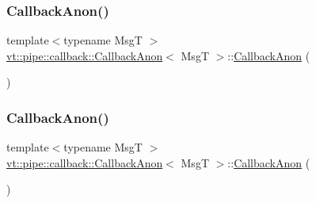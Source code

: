 \subsubsection{\texorpdfstring{Callback\+Anon()}{CallbackAnon()}\hspace{0.1cm}{\footnotesize\ttfamily [1/3]}}
{\footnotesize\ttfamily template$<$typename MsgT $>$ \\
\hyperlink{structvt_1_1pipe_1_1callback_1_1_callback_anon}{vt\+::pipe\+::callback\+::\+Callback\+Anon}$<$ MsgT $>$\+::\hyperlink{structvt_1_1pipe_1_1callback_1_1_callback_anon}{Callback\+Anon} (\begin{DoxyParamCaption}{ }\end{DoxyParamCaption})\hspace{0.3cm}{\ttfamily [default]}}

\mbox{\label{structvt_1_1pipe_1_1callback_1_1_callback_anon_a1979ced8fbd839d64f67eafb8fccdcff}} 
\subsubsection{\texorpdfstring{Callback\+Anon()}{CallbackAnon()}\hspace{0.1cm}{\footnotesize\ttfamily [2/3]}}
{\footnotesize\ttfamily template$<$typename MsgT $>$ \\
\hyperlink{structvt_1_1pipe_1_1callback_1_1_callback_anon}{vt\+::pipe\+::callback\+::\+Callback\+Anon}$<$ MsgT $>$\+::\hyperlink{structvt_1_1pipe_1_1callback_1_1_callback_anon}{Callback\+Anon} (\begin{DoxyParamCaption}\item[{\hyperlink{structvt_1_1pipe_1_1callback_1_1_callback_anon}{Callback\+Anon}$<$ MsgT $>$ const \&}]{ }\end{DoxyParamCaption})\hspace{0.3cm}{\ttfamily [default]}}

\mbox{\label{structvt_1_1pipe_1_1callback_1_1_callback_anon_ad9b8f6ae2a97e9e6b0e6cdbdbab34952}} 
